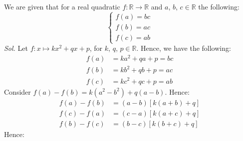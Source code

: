 \documentclass[12pt]{article}
\begin{document}
We are given that for a real quadratic $f: \mathbb{R} \to \mathbb{R}$ and $a$, $b$, $c \in \mathbb{R}$ the following:
\[\begin{cases} f(a) = bc \\ f(b) = ac \\ f(c) = ab \end{cases}\]
\textit{ Sol. }
Let $f: x \mapsto kx^2 + qx + p$, for $k$, $q$, $p \in \mathbb{R}$.
Hence, we have the following:
\begin{align*}
	f(a) & = ka^2 + qa + p = bc \\
	f(b) & = kb^2 + qb + p = ac \\
	f(c) & = kc^2 + qc + p = ab
\end{align*}
Consider $f(a) - f(b) = k(a^2 - b^2) + q(a - b)$.
Hence:
\begin{align*}
  f(a) - f(b) &= (a-b)[k(a+b) + q]\\
  f(c) - f(a) &= (c-a)[k(a+c) + q]\\
  f(b) - f(c) &= (b-c)[k(b+c) + q]
\end{align*}
Hence:
\end{document}
